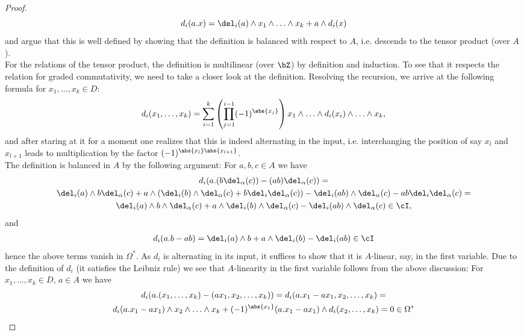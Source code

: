 \begin{prop}
\begin{proof}
\[
  d_i (a.x) = \del_i(a) \wedge %
  x_1 \wedge \ldots \wedge x_k + a \wedge d_i(x)
\]
and argue that this is well defined by showing that the definition is balanced with respect to $A$, i.e. descends to the tensor product (over $A$).\\
For the relations of the tensor product, the definition is multilinear (over $\bZ$) by definition and induction. To see that it respects the relation for graded commutativity, we need to take a closer look at the definition. Resolving the recursion, we arrive at the following formula for $x_1, \ldots, x_k \in D$:
\begin{equation*}
  d_i (x_1, \ldots , x_k) = %
  \sum_{i=1}^k %
  \left( \prod_{j=1}^{i-1} (-1)^{\abs{x_j}} \right) %
  x_1 \wedge \ldots \wedge d_i (x_i) %
  \wedge \ldots \wedge x_k,
\end{equation*}
and after staring at it for a moment one realizes that this is indeed alternating in the input, i.e. interchanging the position of say $x_l$ and $x_{l+1}$ leads to multiplication by the factor $(-1)^{\abs{x_l}\abs{x_{l+1}}}$.\\
The definition is balanced in $A$ by the following argument: For $a,b,c \in A$ we have
\begin{gather*}
  d_i ( a . (b \del_\alpha (c)) - %
    (ab) \del_\alpha (c) ) = \\ %
  \del_i(a) \wedge b \del_\alpha(c) + %
    a \wedge ( \del_i(b) \wedge \del_\alpha (c) + %
      b \del_i \del_\alpha (c) ) - %
    \del_i(ab) \wedge \del_\alpha (c) - %
    ab \del_i \del_\alpha (c) = \\%
  \del_i (a) \wedge b \wedge \del_\alpha (c) + %
    a \wedge \del_i (b) \wedge \del_\alpha (c) - %
    \del_i (ab) \wedge \del_\alpha (c) \in \cI,%
\end{gather*}
and
\begin{gather*}
  d_i(a.b - ab) = \del_i (a) \wedge b + a \wedge \del_i (b) - \del_i (ab) \in \cI
\end{gather*}
hence the above terms vanish in $\Omega^*$. As $d_i$ is alternating in its input, it suffices to show that it is $A$-linear, say, in the first variable. Due to the definition of $d_i$ (it satisfies the Leibniz rule) we see that $A$-linearity in the first variable follows from the above discussion: For $x_1 , \ldots , x_k \in D$, $a \in A$ we have
\begin{gather*}
  d_i (a. (x_1, \ldots, x_k) - (a x_1, x_2, \ldots, x_k)) = %
  d_i (a.x_1 - a x_1, x_2, \ldots , x_k) = \\ %
  d_i (a.x_1 - a x_1) \wedge x_2 \wedge \ldots \wedge x_k + (-1)^{\abs{x_1}} (a.x_1 - a x_1) \wedge d_i (x_2, \ldots , x_k) = 0 \in \Omega^* %

\end{gather*}
\end{proof}
\end{prop}
